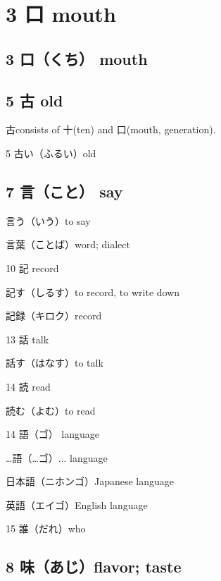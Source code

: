 \chapter{3 口 mouth}

\section{3 口（くち） mouth}

\section{5 古 old}

古consists of 十(ten) and 口(mouth, generation).

5 古い（ふるい）old

\section{7 言（こと） say}

言う（いう）to say

言葉（ことば）word; dialect

10 記 record

記す（しるす）to record, to write down

記録（キロク）record

13 話 talk

話す（はなす）to talk

14 読 read

読む（よむ）to read

14 語（ゴ） language

…語（…ゴ）... language

日本語（ニホンゴ）Japanese language

英語（エイゴ）English language

15 誰（だれ）who

\section{8 味（あじ）flavor; taste}
